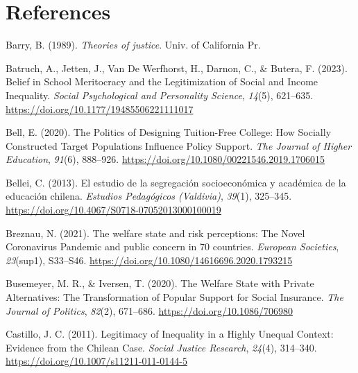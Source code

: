 \documentclass[
  12pt,
  a4paper,
]{article}
\newlength{\cslhangindent}
\newlength{\cslentryspacingunit} %
\newenvironment{CSLReferences}[2] %
 {%
  \setlength{\parindent}{0pt}
  \ifodd #1
  \let\oldpar\par
  \def\par{\hangindent=\cslhangindent\oldpar}
  \fi
  \setlength{\parskip}{#2\cslentryspacingunit}
 }%
 {}
\begin{document}
\hypertarget{references}{%
\section{References}\label{references}}

\hypertarget{refs}{}
\begin{CSLReferences}{1}{0}
\leavevmode{}%
Barry, B. (1989). \emph{Theories of justice}. Univ. of California Pr.

\leavevmode{}%
Batruch, A., Jetten, J., Van De Werfhorst, H., Darnon, C., \& Butera, F.
(2023). Belief in {School Meritocracy} and the {Legitimization} of
{Social} and {Income Inequality}. \emph{Social Psychological and
Personality Science}, \emph{14}(5), 621--635.
\url{https://doi.org/10.1177/19485506221111017}

\leavevmode{}%
Bell, E. (2020). The {Politics} of {Designing Tuition-Free College}:
{How Socially Constructed Target Populations Influence Policy Support}.
\emph{The Journal of Higher Education}, \emph{91}(6), 888--926.
\url{https://doi.org/10.1080/00221546.2019.1706015}

\leavevmode{}%
Bellei, C. (2013). El estudio de la segregaci{ó}n socioecon{ó}mica y
acad{é}mica de la educaci{ó}n chilena. \emph{Estudios Pedag{ó}gicos
(Valdivia)}, \emph{39}(1), 325--345.
\url{https://doi.org/10.4067/S0718-07052013000100019}

\leavevmode{}%
Breznau, N. (2021). The welfare state and risk perceptions: The {Novel
Coronavirus Pandemic} and public concern in 70 countries. \emph{European
Societies}, \emph{23}(sup1), S33--S46.
\url{https://doi.org/10.1080/14616696.2020.1793215}

\leavevmode{}%
Busemeyer, M. R., \& Iversen, T. (2020). The {Welfare State} with
{Private Alternatives}: {The Transformation} of {Popular Support} for
{Social Insurance}. \emph{The Journal of Politics}, \emph{82}(2),
671--686. \url{https://doi.org/10.1086/706980}

\leavevmode{}%
Castillo, J. C. (2011). Legitimacy of {Inequality} in a {Highly Unequal
Context}: {Evidence} from the {Chilean Case}. \emph{Social Justice
Research}, \emph{24}(4), 314--340.
\url{https://doi.org/10.1007/s11211-011-0144-5}


\end{CSLReferences}
\end{document}
